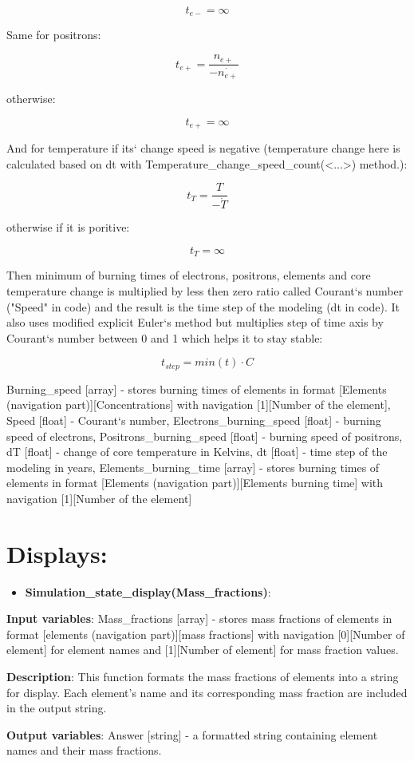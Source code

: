 \documentclass[a4paper,12pt]{article}
\newcommand{\namefunction}[4]{
  \begin{itemize}
    \item \textbf{#1}:
  \end{itemize}
  
  \textbf{Input variables}: #2.
  
  \textbf{Description}: #3.
  
  \textbf{Output variables}: #4.
}
\begin{document}
{\[t_{e-} = \infty\]

Same for positrons:

\[t_{e+} = \frac{n_{e+}}{-\dot{n_{e+}}}\]

otherwise:

\[t_{e+} = \infty\]

And for temperature if its` change speed is negative (temperature change here is calculated based on dt with Temperature\_change\_speed\_count(<...>) method.):

\[t_{T} = \frac{T}{-\dot{T}}\]

otherwise if it is poritive:

\[t_{T} = \infty\]

Then minimum of burning times of electrons, positrons, elements and core temperature change is multiplied by less then zero ratio called Courant`s number ("Speed" in code) and the result is the time step of the modeling (dt in code). It also uses modified explicit Euler`s method but multiplies step of time axis by Courant`s number between 0 and 1 which helps it to stay stable:

\[t_{step} = min(t) \cdot C\]

}{Burning\_speed [array] - stores burning times of elements in format [Elements (navigation part)][Concentrations] with navigation [1][Number of the element], Speed [float] - Courant`s number, Electrons\_burning\_speed [float] - burning speed of electrons, Positrons\_burning\_speed [float] - burning speed of positrons, dT [float] - change of core temperature in Kelvins, dt [float] - time step of the modeling in years, Elements\_burning\_time [array] - stores burning times of elements in format [Elements (navigation part)][Elements burning time] with navigation [1][Number of the element]}

\section{Displays:}

\vspace{1em}

\namefunction{Simulation\_state\_display(Mass\_fractions)}{Mass\_fractions [array] - stores mass fractions of elements in format [elements (navigation part)][mass fractions] with navigation [0][Number of element] for element names and [1][Number of element] for mass fraction values}{This function formats the mass fractions of elements into a string for display. Each element's name and its corresponding mass fraction are included in the output string}{Answer [string] - a formatted string containing element names and their mass fractions}
\end{document}
